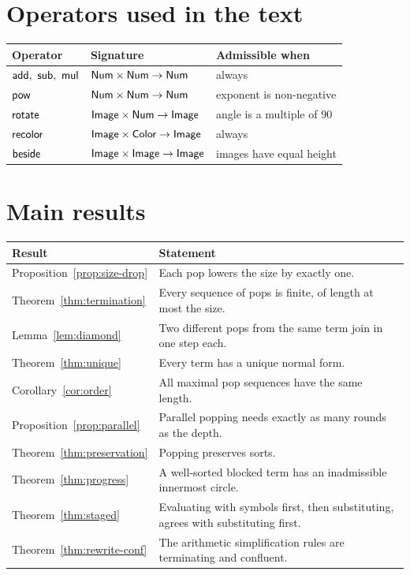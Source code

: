 \section*{Operators used in the text}

\begin{center}
\begin{tabular}{@{}lll@{}}
\toprule
Operator & Signature & Admissible when\\
\midrule
$\op{add},\ \op{sub},\ \op{mul}$ & $\mathsf{Num}\times\mathsf{Num}\to\mathsf{Num}$ & always\\
$\mathsf{pow}$ & $\mathsf{Num}\times\mathsf{Num}\to\mathsf{Num}$ & exponent is non-negative\\
$\mathsf{rotate}$ & $\mathsf{Image}\times\mathsf{Num}\to\mathsf{Image}$ & angle is a multiple of $90$\\
$\mathsf{recolor}$ & $\mathsf{Image}\times\mathsf{Color}\to\mathsf{Image}$ & always\\
$\mathsf{beside}$ & $\mathsf{Image}\times\mathsf{Image}\to\mathsf{Image}$ & images have equal height\\
\bottomrule
\end{tabular}
\end{center}

\section*{Main results}

\begin{center}
\begin{tabular}{@{}lp{}@{}}
\toprule
Result & Statement\\
\midrule
Proposition~\ref{prop:size-drop} & Each pop lowers the size by exactly one.\\
Theorem~\ref{thm:termination} & Every sequence of pops is finite, of length at most the size.\\
Lemma~\ref{lem:diamond} & Two different pops from the same term join in one step each.\\
Theorem~\ref{thm:unique} & Every term has a unique normal form.\\
Corollary~\ref{cor:order} & All maximal pop sequences have the same length.\\
Proposition~\ref{prop:parallel} & Parallel popping needs exactly as many rounds as the depth.\\
Theorem~\ref{thm:preservation} & Popping preserves sorts.\\
Theorem~\ref{thm:progress} & A well-sorted blocked term has an inadmissible innermost circle.\\
Theorem~\ref{thm:staged} & Evaluating with symbols first, then substituting, agrees with substituting first.\\
Theorem~\ref{thm:rewrite-conf} & The arithmetic simplification rules are terminating and confluent.\\
\bottomrule
\end{tabular}
\end{center}
